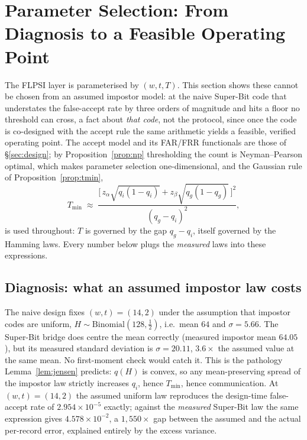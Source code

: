 \section{Parameter Selection: From Diagnosis to a Feasible Operating Point}
\label{sec:params}

The FLPSI layer is parameterised by $(w,t,T)$. This section shows these cannot be chosen from an
assumed impostor model: at the naive Super-Bit code that understates the false-accept rate by three
orders of magnitude and hits a floor no threshold can cross, a fact about \emph{that code}, not the
protocol, since once the code is co-designed with the accept rule the same arithmetic yields a feasible,
verified operating point. The accept model and its FAR/FRR functionals are those of \S\ref{sec:design};
by Proposition~\ref{prop:np} thresholding the count is Neyman--Pearson optimal, which makes parameter
selection one-dimensional, and the Gaussian rule of Proposition~\ref{prop:tmin},
\begin{equation}
\label{eq:tmin}
T_{\min} \;\approx\; \frac{\bigl[\,z_\alpha\sqrt{q_i(1-q_i)} + z_\beta\sqrt{q_g(1-q_g)}\,\bigr]^2}
                            {(q_g - q_i)^2},
\end{equation}
is used throughout: $T$ is governed by the gap $q_g-q_i$, itself governed by the Hamming laws. Every
number below plugs the \emph{measured} laws into these expressions.

\subsection{Diagnosis: what an assumed impostor law costs}
\label{sec:diagnosis}

The naive design fixes $(w,t)=(14,2)$ under the assumption that impostor codes are uniform,
$H \sim \mathrm{Binomial}(128,\tfrac12)$, i.e.\ mean $64$ and $\sigma=5.66$. The Super-Bit bridge does
centre the mean correctly (measured impostor mean $64.05$), but its measured standard deviation is
$\sigma=20.11$, $3.6\times$ the assumed value at the same mean. No first-moment check would catch it.
This is the pathology Lemma~\ref{lem:jensen} predicts: $q(H)$ is convex, so any mean-preserving spread
of the impostor law strictly increases $q_i$, hence $T_{\min}$, hence communication. At $(w,t)=(14,2)$
the assumed uniform law reproduces the design-time false-accept rate of $2.954\times10^{-5}$ exactly;
against the \emph{measured} Super-Bit law the same expression gives $4.578\times10^{-2}$, a
$1{,}550\times$ gap between the assumed and the actual per-record error, explained entirely by the
excess variance.

